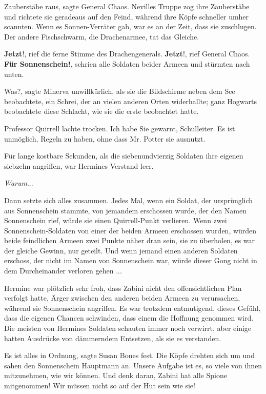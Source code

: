 \glqq{}Zauberstäbe raus\grqq{}, sagte General Chaos. Nevilles Truppe zog ihre
Zauberstäbe und richtete sie geradeaus auf den Feind, während ihre Köpfe
schneller umher scannten. Wenn es Sonnen-Verräter gab, war es an der Zeit, dass
sie zuschlugen. Der andere Fischschwarm, die Drachenarmee, tat das Gleiche.

\glqq{}\textbf{Jetzt}!\grqq{}, rief die ferne Stimme des Drachengenerals. \glqq{}
\textbf{Jetzt}!\grqq{}, rief General Chaos. \glqq{}\textbf{Für
Sonnenschein!}\grqq{}, schrien alle Soldaten beider Armeen und stürmten nach
unten.

\glqq{}Was?\grqq{}, sagte Minerva unwillkürlich, als sie die Bildschirme neben
dem See beobachtete, ein Schrei, der an vielen anderen Orten widerhallte; ganz
Hogwarts beobachtete diese Schlacht, wie sie die erste beobachtet hatte.

Professor Quirrell lachte trocken. \glqq{}Ich habe Sie gewarnt, Schulleiter. Es
ist unmöglich, Regeln zu haben, ohne dass Mr. Potter sie ausnutzt.\grqq{}

Für lange kostbare Sekunden, als die siebenundvierzig Soldaten ihre eigenen
siebzehn angriffen, war Hermines Verstand leer.

\emph{Warum}...

Dann setzte sich alles zusammen. Jedes Mal, wenn ein Soldat, der ursprünglich
aus Sonnenschein stammte, von jemandem erschossen wurde, der den Namen
Sonnenschein rief, würde sie einen Quirrell-Punkt verlieren. Wenn zwei
Sonnenschein-Soldaten von einer der beiden Armeen erschossen wurden, würden
beide feindlichen Armeen zwei Punkte näher dran sein, sie zu überholen, es war
der gleiche Gewinn, nur geteilt. Und wenn jemand einen anderen Soldaten
erschoss, der nicht im Namen von Sonnenschein war, würde dieser Gong nicht in
dem Durcheinander verloren gehen ...

Hermine war plötzlich sehr froh, dass Zabini nicht den offensichtlichen Plan
verfolgt hatte, Ärger zwischen den anderen beiden Armeen zu verursachen, während
sie Sonnenschein angriffen. Es war trotzdem entmutigend, dieses Gefühl, dass die
eigenen Chancen schwinden, dass einem die Hoffnung genommen wird. Die meisten
von Hermines Soldaten schauten immer noch verwirrt, aber einige hatten Ausdrücke
von dämmerndem Entsetzen, als sie es verstanden.

\glqq{}Es ist alles in Ordnung\grqq{}, sagte Susan Bones fest. Die Köpfe drehten
sich um und sahen den Sonnenschein Hauptmann an. \glqq{}Unsere Aufgabe ist es, so
viele von ihnen mitzunehmen, wie wir können. Und denk daran, Zabini hat alle
Spione mitgenommen! Wir müssen nicht so auf der Hut sein wie sie!\grqq{}

